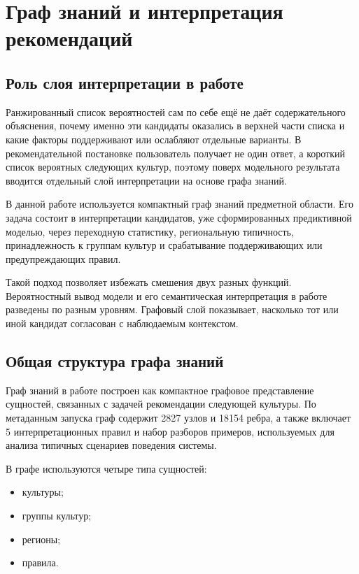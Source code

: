 \section{Граф знаний и интерпретация рекомендаций}

\subsection{Роль слоя интерпретации в работе}

Ранжированный список вероятностей сам по себе ещё не даёт содержательного объяснения,
почему именно эти кандидаты оказались в верхней части списка и какие факторы
поддерживают или ослабляют отдельные варианты. В рекомендательной постановке
пользователь получает не один ответ, а короткий список вероятных следующих культур,
поэтому поверх модельного результата вводится отдельный слой интерпретации на основе
графа знаний.

В данной работе используется компактный граф знаний предметной области. Его задача состоит в интерпретации
кандидатов, уже сформированных предиктивной моделью, через переходную статистику,
региональную типичность, принадлежность к группам культур и срабатывание поддерживающих
или предупреждающих правил.

Такой подход позволяет избежать смешения двух разных функций. Вероятностный вывод модели
и его семантическая интерпретация в работе разведены по разным уровням. Графовый слой
показывает, насколько тот или иной кандидат согласован с наблюдаемым контекстом.

\subsection{Общая структура графа знаний}

Граф знаний в работе построен как компактное графовое представление сущностей,
связанных с задачей рекомендации следующей культуры. По метаданным запуска граф
содержит 2827 узлов и 18154 ребра, а также включает 5 интерпретационных правил и
набор разборов примеров, используемых для анализа типичных сценариев поведения системы.

В графе используются четыре типа сущностей:

\begin{itemize}
\tightlist
\item
  культуры;
\item
  группы культур;
\item
  регионы;
\item
  правила.
\end{itemize}

